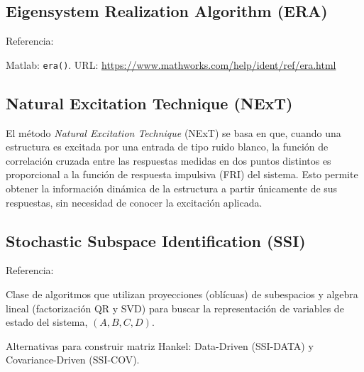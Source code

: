 
\subsection{Eigensystem Realization Algorithm (ERA)}

Referencia: \textcite{Juang1985}

Matlab: \texttt{era()}. URL: \url{https://www.mathworks.com/help/ident/ref/era.html}

\subsection{Natural Excitation Technique (NExT)}

El método \emph{Natural Excitation Technique} (NExT) se basa en que, cuando una estructura es excitada por una entrada de tipo ruido blanco, la función de correlación cruzada entre las respuestas medidas en dos puntos distintos es proporcional a la función de respuesta impulsiva (FRI) del sistema. Esto permite obtener la información dinámica de la estructura a partir únicamente de sus respuestas, sin necesidad de conocer la excitación aplicada.



\subsection{Stochastic Subspace Identification (SSI)}

Referencia: \textcite{vanoverschee2011subspaceidentification}

Clase de algoritmos que utilizan proyecciones (oblícuas) de subespacios y algebra lineal (factorización QR y SVD) para buscar la representación de variables de estado del sistema, $(A, B, C, D)$.

Alternativas para construir matriz Hankel: Data-Driven (SSI-DATA) y Covariance-Driven (SSI-COV).


